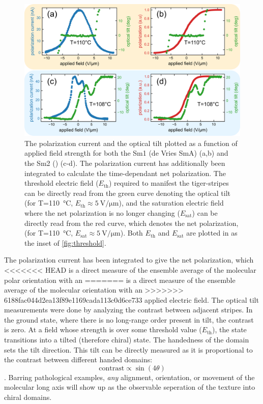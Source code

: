 \documentclass[aagreenthesis]{subfiles}
\begin{document}
\begin{figure}[h!]
    \centering
    \includegraphics[width=.6\textwidth]{./figs/pal30/prc/PRCvsTilt/PRCVtilt.png}
    \caption{\label{fig:homog:pal30pvt} The polarization current and the optical
    tilt plotted as a function of applied field strength for both the Sm1
(de Vries SmA) (a,b) and the Sm2 (\smcpalpha{}) (c-d). The polarization current
has additionally been integrated to calculate the time-dependant net
polarization. The threshold electric field ($E_\textrm{th}$) required to manifest the tiger-stripes can
be directly read from the green curve denoting the optical tilt (for
T=\SI{110}{\degreeCelsius}, $E_\textrm{th} \approx \SI{5}{\volt\per\micro\metre}$),
and the saturation electric field where the net polarization is no longer
changing ($E_\textrm{sat}$) can be directly
read from the red curve, which denotes the net polarization, (for
T=\SI{110}{\degreeCelsius}, $E_\textrm{sat} \approx \SI{5}{\volt\per\micro\metre}$).
Both $E_\textrm{th}$ and $E_\textrm{sat}$ are plotted in as the inset of
\autoref{fig:threshold}. }
\end{figure}

The polarization current has been integrated to give the net polarization, which
<<<<<<< HEAD
is a direct measure of the ensemble average of the molecular polar orientation with an
=======
is a direct measure of the ensemble average of the molecular orientation with an
>>>>>>> 6188fac044d2ea13f89e1169cada113c0d6ce733
applied electric field. The optical tilt measurements were done by analyzing the
contrast between adjacent stripes. In the ground
state, where there is no long-range order present in tilt, the contrast is zero.
At a field whose strength is over some threshold value ($E_\textrm{th}$), the
state transitions into a tilted (therefore chiral) state. The handedness of the
domain sets the tilt direction. This tilt can be directly measured as it is
proportional to the contrast between different handed domains:
\begin{equation}
    \textrm{contrast}\propto \sin(4\theta)
\end{equation}.
Barring pathological examples, \textit{any} alignment, orientation, or movement
of the molecular long axis will show up as the observable seperation of the
texture into chiral domains. 
\end{document}
